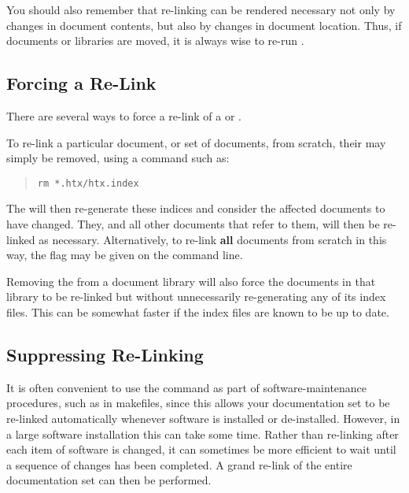You should also remember that re-linking can be rendered necessary not
only by changes in document contents, but also by changes in document
location. Thus, if documents or libraries are moved, it is always wise
to re-run .

\subsection{Forcing a Re-Link}

There are several ways to force a re-link of a  or
.

To re-link a particular document, or set of documents, from scratch,
their  may simply be removed, using a command
such as:

\begin{quote}
\begin{verbatim}
rm *.htx/htx.index
\end{verbatim}
\end{quote}

The  will then re-generate these indices and
consider the affected documents to have changed. They, and all other
documents that refer to them, will then be re-linked as
necessary. Alternatively, to re-link {\bf all} documents from scratch
in this way, the  flag may be given on the  command
line.

Removing the 
from a document library will also force the documents in that library
to be re-linked but without unnecessarily re-generating any of its
index files.  This can be somewhat faster if the index files are known
to be up to date.

\subsection{\label{sect:suppressing}Suppressing Re-Linking}

It is often convenient to use the  command as
part of software-maintenance procedures, such as in makefiles, since
this allows your documentation set to be re-linked automatically
whenever software is installed or de-installed. However, in a large
software installation this can take some time. Rather than re-linking
after each item of software is changed, it can sometimes be more
efficient to wait until a sequence of changes has been completed. A
grand re-link of the entire documentation set can then be performed.

